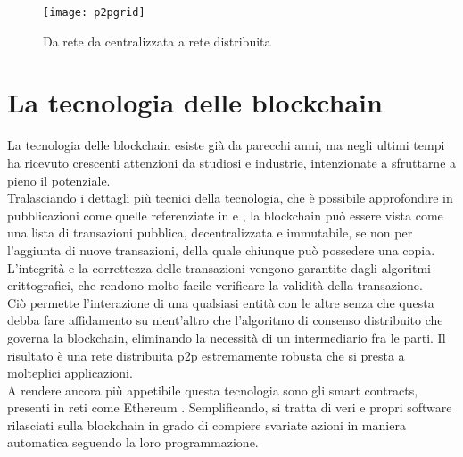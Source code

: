 \begin{figure}[h]
    \texttt{[image: p2pgrid]}
    \centering
    \caption{Da rete da centralizzata a rete distribuita \cite{img:p2pgrid}}
    \label{lab:p2pgrid}
\end{figure}


\section{La tecnologia delle blockchain}
La tecnologia delle blockchain esiste già da parecchi anni, ma negli ultimi tempi ha ricevuto crescenti attenzioni da studiosi e industrie, intenzionate a sfruttarne a pieno il potenziale. \\
Tralasciando i dettagli più tecnici della tecnologia, che è possibile approfondire in pubblicazioni come quelle referenziate in \cite{art:blockchain} e \cite{art:blockchain-for-industry},
la blockchain può essere vista come una lista di transazioni pubblica, decentralizzata e immutabile, se non per l'aggiunta di nuove transazioni, della quale chiunque può possedere una copia. \\
L'integrità e la correttezza delle transazioni vengono garantite dagli algoritmi crittografici, che rendono molto facile verificare la validità della transazione. \\
Ciò permette l'interazione di una qualsiasi entità con le altre senza che questa debba fare affidamento su nient'altro che l'algoritmo di consenso distribuito che governa la blockchain, eliminando la necessità di un intermediario fra le parti.
Il risultato è una rete distribuita \gls{p2p} estremamente robusta che si presta a molteplici applicazioni. \\
A rendere ancora più appetibile questa tecnologia sono gli smart contracts, presenti in reti come Ethereum \cite{wiki:eth-smart-contracts}. Semplificando, si tratta di veri e propri software rilasciati sulla blockchain
in grado di compiere svariate azioni in maniera automatica seguendo la loro programmazione.